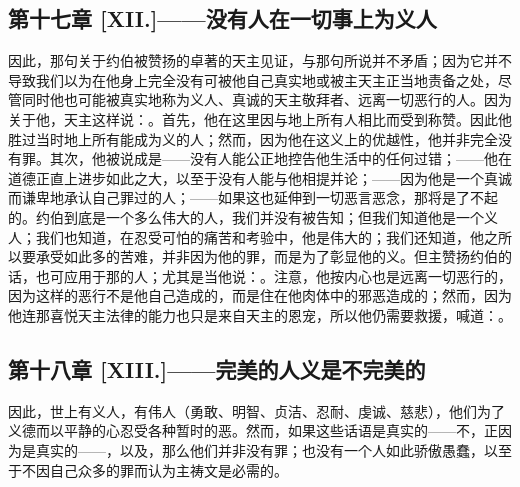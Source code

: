 
\subsection{第十七章 [XII.]——没有人在一切事上为义人}

因此，那句关于约伯被赞扬的卓著的天主见证，与那句所说并不矛盾；因为它并不导致我们以为在他身上完全没有可被他自己真实地或被主天主正当地责备之处，尽管同时他也可能被真实地称为义人、真诚的天主敬拜者、远离一切恶行的人。因为关于他，天主这样说：。首先，他在这里因与地上所有人相比而受到称赞。因此他胜过当时地上所有能成为义的人；然而，因为他在这义上的优越性，他并非完全没有罪。其次，他被说成是——没有人能公正地控告他生活中的任何过错；——他在道德正直上进步如此之大，以至于没有人能与他相提并论；——因为他是一个真诚而谦卑地承认自己罪过的人；——如果这也延伸到一切恶言恶念，那将是了不起的。约伯到底是一个多么伟大的人，我们并没有被告知；但我们知道他是一个义人；我们也知道，在忍受可怕的痛苦和考验中，他是伟大的；我们还知道，他之所以要承受如此多的苦难，并非因为他的罪，而是为了彰显他的义。但主赞扬约伯的话，也可应用于那的人；尤其是当他说：。注意，他按内心也是远离一切恶行的，因为这样的恶行不是他自己造成的，而是住在他肉体中的邪恶造成的；然而，因为他连那喜悦天主法律的能力也只是来自天主的恩宠，所以他仍需要救援，喊道：。\par


\subsection{第十八章 [XIII.]——完美的人义是不完美的}

因此，世上有义人，有伟人（勇敢、明智、贞洁、忍耐、虔诚、慈悲），他们为了义德而以平静的心忍受各种暂时的恶。然而，如果这些话语是真实的——不，正因为是真实的——，以及，那么他们并非没有罪；也没有一个人如此骄傲愚蠢，以至于不因自己众多的罪而认为主祷文是必需的。\par


